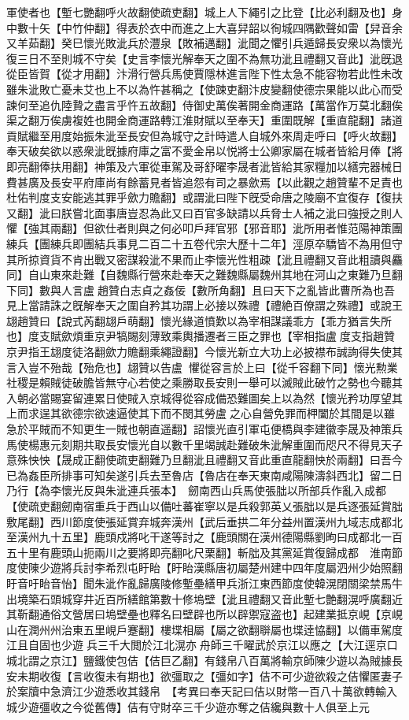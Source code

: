 軍使者也【塹七艷翻呼火故翻使疏吏翻】城上人下繩引之比登【比必利翻及也】身中數十矢【中竹仲翻】得表於衣中而進之上大喜舁韶以徇城四隅歡聲如雷【舁音余又羊茹翻】癸巳懷光敗泚兵於灃泉【敗補邁翻】泚聞之懼引兵遁歸長安衆以為懷光復三日不至則城不守矣【史言李懷光解奉天之圍不為無功泚且禮翻又音此】泚旣退從臣皆賀【從才用翻】汴滑行營兵馬使賈隱林進言陛下性太急不能容物若此性未改雖朱泚敗亡憂未艾也上不以為忤甚稱之【使踈吏翻汴皮變翻使德宗果能以此心而受諫何至追仇陸贄之盡言乎忤五故翻】侍御史萬俟著開金商運路【萬當作万莫北翻俟渠之翻万俟虜複姓也開金商運路轉江淮財賦以至奉天】重圍既解【重直龍翻】諸道貢賦繼至用度始振朱泚至長安但為城守之計時遣人自城外來周走呼曰【呼火故翻】奉天破矣欲以惑衆泚旣據府庫之富不愛金帛以悦將士公卿家屬在城者皆給月俸【將即亮翻俸扶用翻】神策及六軍從車駕及哥舒曜李晟者泚皆給其家糧加以繕完器械日費甚廣及長安平府庫尚有餘蓄見者皆追怨有司之暴歛焉【以此觀之趙贊輩不足責也杜佑判度支安能逃其罪乎歛力贍翻】或謂泚曰陛下旣受命唐之陵廟不宜復存【復扶又翻】泚曰朕嘗北面事唐豈忍為此又曰百官多缺請以兵脅士人補之泚曰強授之則人懼【強其兩翻】但欲仕者則與之何必叩戶拜官邪【邪音耶】泚所用者惟范陽神策團練兵【團練兵即團結兵事見二百二十五卷代宗大歷十二年】涇原卒驕皆不為用但守其所掠資貨不肯出戰又密謀殺泚不果而止李懷光性粗疎【泚且禮翻又音此粗讀與麤同】自山東來赴難【自魏縣行營來赴奉天之難魏縣屬魏州其地在河山之東難乃旦翻下同】數與人言盧趙贊白志貞之姦佞【數所角翻】且曰天下之亂皆此曹所為也吾見上當請誅之旣解奉天之圍自矜其功謂上必接以殊禮【禮絶百僚謂之殊禮】或說王翃趙贊曰【說式芮翻翃戶萌翻】懷光緣道憤歎以為宰相謀議乖方【乖方猶言失所也】度支賦歛煩重京尹犒賜刻薄致乘輿播遷者三臣之罪也【宰相指盧度支指趙贊京尹指王翃度徒洛翻歛力贍翻乘繩證翻】今懷光新立大功上必披襟布誠詢得失使其言入豈不殆哉【殆危也】翃贊以告盧懼從容言於上曰【從千容翻下同】懷光勲業社稷是賴賊徒破膽皆無守心若使之乘勝取長安則一舉可以滅賊此破竹之勢也今聽其入朝必當賜宴留連累日使賊入京城得從容成備恐難圖矣上以為然【懷光矜功厚望其上而求逞其欲德宗欲速逼使其下而不閔其勞盧之心自營免罪而柙闔於其間是以雖急於平賊而不知更生一賊也朝直遥翻】詔懷光直引軍屯便橋與李建徽李晟及神策兵馬使楊惠元刻期共取長安懷光自以數千里竭誠赴難破朱泚解重圍而咫尺不得見天子意殊怏怏【晟成正翻使疏吏翻難乃旦翻泚且禮翻又音此重直龍翻怏於兩翻】曰吾今已為姦臣所排事可知矣遂引兵去至魯店【魯店在奉天東南咸陽陳濤斜西北】留二日乃行【為李懷光反與朱泚連兵張本】　劒南西山兵馬使張朏以所部兵作亂入成都【使疏吏翻劒南宿重兵于西山以備吐蕃崔寧以是兵殺郭英乂張朏以是兵逐張延賞朏敷尾翻】西川節度使張延賞弃城奔漢州【武后垂拱二年分益州置漢州九域志成都北至漢州九十五里】鹿頭戍將叱干遂等討之【鹿頭關在漢州德陽縣劉昫曰成都北一百五十里有鹿頭山扼兩川之要將即亮翻叱尺栗翻】斬朏及其黨延賞復歸成都　淮南節度使陳少遊將兵討李希烈屯盱眙【盱眙漢縣唐初屬楚州建中四年度屬泗州少始照翻盱音吁眙音怡】聞朱泚作亂歸廣陵修塹壘繕甲兵浙江東西節度使韓滉閉關梁禁馬牛出境築石頭城穿井近百所繕館第數十修塢壁【泚且禮翻又音此塹七艶翻滉呼廣翻近其靳翻通俗文營居曰塢壁壘也釋名曰壁辟也所以辟禦寇盗也】起建業抵京峴【京峴山在潤州州治東五里峴戶蹇翻】樓堞相屬【屬之欲翻聨屬也堞逹恊翻】以備車駕度江且自固也少遊兵三千大閲於江北滉亦舟師三千曜武於京江以應之【大江逕京口城北謂之京江】鹽鐵使包佶【佶巨乙翻】有錢帛八百萬將輸京師陳少遊以為賊據長安未期收復【言收復未有期也】欲彊取之【彊如字】佶不可少遊欲殺之佶懼匿妻子於案牘中急濟江少遊悉收其錢帛　【考異曰奉天記曰佶以財幣一百八十萬欲轉輸入城少遊彊收之今從舊傳】佶有守財卒三千少遊亦奪之佶纔與數十人俱至上元
